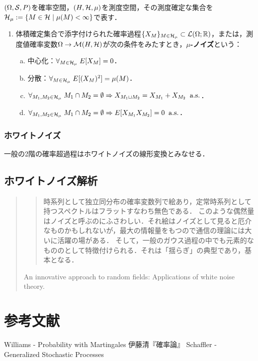\documentclass[uplatex,dvipdfmx]{jsreport}
\begin{document}
\begin{definition}
    $(\Omega,\mathcal{S},P)$を確率空間，$(H,\mathcal{H},\mu)$を測度空間，その測度確定な集合を$\mathcal{H}_\mu:=\{M\in\mathcal{H}\mid\mu(M)<\infty\}$で表す．
    \begin{enumerate}
        \item 体積確定集合で添字付けられた確率過程$\{X_M\}_{M\in\mathcal{H}_\mu}\subset\mathcal{L}(\Omega;\mathbb{R})$，または，測度値確率変数$\Omega\to\mathcal{M}(H,\mathcal{H})$が次の条件をみたすとき，\textbf{$\mu$-ノイズ}という：
        \begin{enumerate}[(a)]
            \item 中心化：$\forall_{M\in\mathcal{H}_\mu}\;E[X_M]=0$．
            \item 分散：$\forall_{M\in\mathcal{H}_\mu}\;E[(X_M)^2]=\mu(M)$．
            \item $\forall_{M_1,M_2\in\mathcal{H}_\mu}\;M_1\cap M_2=\emptyset\Rightarrow X_{M_1\sqcup M_2}=X_{M_1}+X_{M_2}\;\;\mathrm{a.s.}$．
            \item $\forall_{M_1,M_2\in\mathcal{H}_\mu}\;M_1\cap M_2=\emptyset\Rightarrow E[X_{M_1}X_{M_2}]=0\;\;\mathrm{a.s.}$．
        \end{enumerate}
    \end{enumerate}
\end{definition}

\subsection{ホワイトノイズ}

\begin{tcolorbox}[colframe=ForestGreen, colback=ForestGreen!10!white,breakable,colbacktitle=ForestGreen!40!white,coltitle=black,fonttitle=\bfseries\sffamily,
title=]
    一般の2階の確率超過程はホワイトノイズの線形変換とみなせる．
\end{tcolorbox}

\section{ホワイトノイズ解析}

\begin{quotation}
    \begin{quote}
        時系列として独立同分布の確率変数列で絵あり，定常時系列として持つスペクトルはフラットすなわち無色である．
        このような偶然量はノイズと呼ぶのにふさわしい．それ絵はノイズとして見ると厄介なものかもしれないが，最大の情報量をもつので通信の理論には大いに活躍の場がある．
        そして，一般のガウス過程の中でも元素的なもののとして特徴付けられる．それは「揺らぎ」の典型であり，基本となる．
    \end{quote}
    An innovative approach to random fields: Applications of white noise theory.
\end{quotation}

\chapter{参考文献}

\begin{thebibliography}{99}
    Williams - Probability with Martingales
    伊藤清『確率論』
    Schaffler - Generalized Stochastic Processes
\end{thebibliography}
\end{document}
